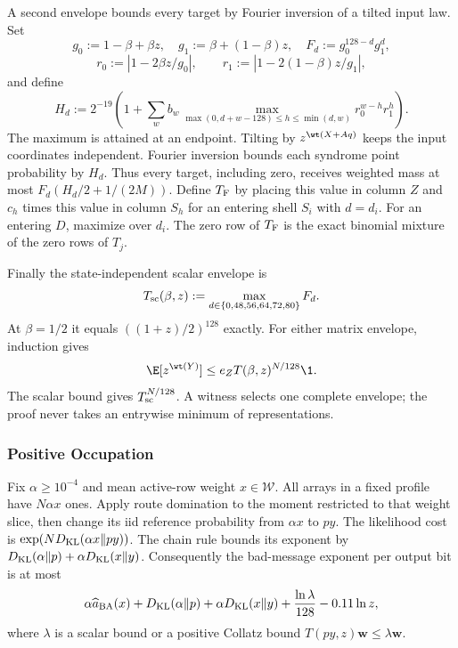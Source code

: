 A second envelope bounds every target by Fourier inversion of a tilted
input law. Set
\[
 g_0:=1-\beta+\beta z,\quad g_1:=\beta+(1-\beta)z,\quad
 F_d:=g_0^{128-d}g_1^d,
\]
\[
 r_0:=|1-2\beta z/g_0|,\qquad
 r_1:=|1-2(1-\beta)z/g_1|,
\]
and define
\[
 H_d:=2^{-19}\left(1+\sum_w b_w
 \max_{\max(0,d+w-128)\le h\le\min(d,w)}r_0^{w-h}r_1^h\right).
\]
The maximum is attained at an endpoint. Tilting by $z^{\wt(X+Aq)}$ keeps
the input coordinates independent. Fourier inversion bounds each syndrome
point probability by $H_d$. Thus every target, including zero, receives
weighted mass at most $F_d(H_d/2+1/(2M))$. Define $T_{\rm F}$ by placing
this value in column $Z$ and $c_h$ times this value in column $S_h$ for an
entering shell $S_i$ with $d=d_i$. For an entering $D$, maximize over $d_i$.
The zero row of $T_{\rm F}$ is the exact binomial mixture of the zero rows of $T_j$.

Finally the state-independent scalar envelope is
\[
 T_{\rm sc}(\beta,z):=\max_{d\in\{0,48,56,64,72,80\}}F_d.
\]
At $\beta=1/2$ it equals $((1+z)/2)^{128}$ exactly. For either matrix
envelope, induction gives
\begin{equation}
 \E[z^{\wt(Y)}]\le e_Z T(\beta,z)^{N/128}\1.
 \label{eq:imt-moment}
\end{equation}
The scalar bound gives $T_{\rm sc}^{N/128}$. A witness selects one complete
envelope; the proof never takes an entrywise minimum of representations.

\subsubsection{Positive Occupation}

Fix $\alpha\ge10^{-4}$ and mean active-row weight $x\in\mathcal W$.
All arrays in a fixed profile have $N\alpha x$ ones. Apply route domination
to the moment restricted to that weight slice, then change its iid reference
probability from $\alpha x$ to $py$. The likelihood cost is
$\exp(ND_{\rm KL}(\alpha x\Vert py))$. The chain rule bounds its exponent by
$D_{\rm KL}(\alpha\Vert p)+\alpha D_{\rm KL}(x\Vert y)$.
Consequently the bad-message exponent per output bit is at most
\begin{equation}
 \alpha\widehat a_{\rm BA}(x)+D_{\rm KL}(\alpha\Vert p)
 +\alpha D_{\rm KL}(x\Vert y)+\frac{\ln\lambda}{128}-0.11\ln z,
 \label{eq:imt-dense-exponent}
\end{equation}
where $\lambda$ is a scalar bound or a positive Collatz bound
$T(py,z)\boldsymbol w\le\lambda\boldsymbol w$.

